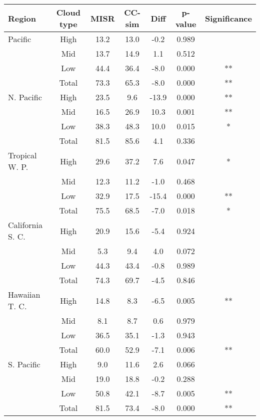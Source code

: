 \begin{tabular}{lcccccc}
\hline\hline
Region & Cloud type &  MISR & CC-sim &  Diff & p-value & Significance \\ \hline
   Pacific &       High &  13.2 &  13.0 &  -0.2 & 0.989 &       \\
           &        Mid &  13.7 &  14.9 &   1.1 & 0.512 &       \\
           &        Low &  44.4 &  36.4 &  -8.0 & 0.000 &    ** \\
           &      Total &  73.3 &  65.3 &  -8.0 & 0.000 &    ** \\
\hline
N. Pacific &       High &  23.5 &   9.6 & -13.9 & 0.000 &    ** \\
           &        Mid &  16.5 &  26.9 &  10.3 & 0.001 &    ** \\
           &        Low &  38.3 &  48.3 &  10.0 & 0.015 &     * \\
           &      Total &  81.5 &  85.6 &   4.1 & 0.336 &       \\
\hline
Tropical W. P. &       High &  29.6 &  37.2 &   7.6 & 0.047 &     * \\
           &        Mid &  12.3 &  11.2 &  -1.0 & 0.468 &       \\
           &        Low &  32.9 &  17.5 & -15.4 & 0.000 &    ** \\
           &      Total &  75.5 &  68.5 &  -7.0 & 0.018 &     * \\
\hline
California S. C. &       High &  20.9 &  15.6 &  -5.4 & 0.924 &       \\
           &        Mid &   5.3 &   9.4 &   4.0 & 0.072 &       \\
           &        Low &  44.3 &  43.4 &  -0.8 & 0.989 &       \\
           &      Total &  74.3 &  69.7 &  -4.5 & 0.846 &       \\
\hline
Hawaiian T. C. &       High &  14.8 &   8.3 &  -6.5 & 0.005 &    ** \\
           &        Mid &   8.1 &   8.7 &   0.6 & 0.979 &       \\
           &        Low &  36.5 &  35.1 &  -1.3 & 0.943 &       \\
           &      Total &  60.0 &  52.9 &  -7.1 & 0.006 &    ** \\
\hline
S. Pacific &       High &   9.0 &  11.6 &   2.6 & 0.066 &       \\
           &        Mid &  19.0 &  18.8 &  -0.2 & 0.288 &       \\
           &        Low &  50.8 &  42.1 &  -8.7 & 0.005 &    ** \\
           &      Total &  81.5 &  73.4 &  -8.0 & 0.000 &    ** \\
\hline
\end{tabular}
